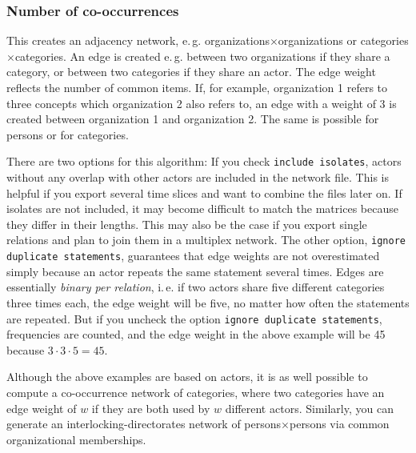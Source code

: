 \documentclass[12pt,a4paper]{scrreprt}
\newcommand{\code}[1]{\texttt{#1}}
\begin{document}
\subsubsection{Number of co-occurrences}
This creates an adjacency network, e.\,g. organiza\-tions$\times$organizations or ca\-te\-go\-ries$\times$ca\-te\-go\-ries. An edge is created e.\,g. between two organizations if they share a category, or between two categories if they share an actor. The edge weight reflects the number of common items. If, for example, organization 1 refers to three concepts which organization 2 also refers to, an edge with a weight of 3 is created between organization 1 and organization 2. The same is possible for persons or for categories.

There are two options for this algorithm: If you check \code{include isolates}, actors without any overlap with other actors are included in the network file. This is helpful if you export several time slices and want to combine the files later on. If isolates are not included, it may become difficult to match the matrices because they differ in their lengths. This may also be the case if you export single relations and plan to join them in a multiplex network. The other option, \code{ignore duplicate statements}, guarantees that edge weights are not overestimated simply because an actor repeats the same statement several times. Edges are essentially \emph{binary per relation}, i.\,e. if two actors share five different categories three times each, the edge weight will be five, no matter how often the statements are repeated. But if you uncheck the option \code{ignore duplicate statements}, frequencies are counted, and the edge weight in the above example will be 45 because $3 \cdot 3 \cdot 5 = 45$.
 
Although the above examples are based on actors, it is as well possible to compute a co-occurrence network of categories, where two categories have an edge weight of $w$ if they are both used by $w$ different actors. Similarly, you can generate an interlocking-directorates network of persons$\times$persons via common organizational memberships.
\end{document}
